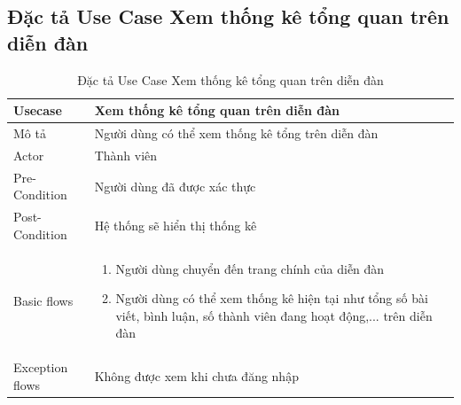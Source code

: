 \documentclass[../index.tex]{subfiles}
\begin{document}
    \subsection{Đặc tả Use Case Xem thống kê tổng quan trên diễn đàn}
    \begin{table}[H]
        \centering
        {}
        \begin{tabular}{ |p{3cm}|p{9cm}| }
            \hline
            Usecase         & Xem thống kê tổng quan trên diễn đàn                                                                                                                                                                                \\
            \hline
            Mô tả           & Người dùng có thể xem thống kê tổng trên diễn đàn                                                                                                                                                                   \\
            \hline
            Actor           & Thành viên                                                                                                                                                                                                          \\
            \hline
            Pre-Condition   & Người dùng đã được xác thực                                                                                                                                                                                         \\
            \hline
            Post-Condition  & Hệ thống sẽ hiển thị thống kê                                                                                                                                                                                       \\
            \hline
            Basic flows     & \begin{enumerate}\item Người dùng chuyển đến trang chính của diễn đàn

\item Người dùng có thể xem thống kê hiện tại như tổng số bài viết, bình luận, số thành viên đang hoạt động,... trên diễn đàn\end{enumerate} \\
            \hline
            Exception flows & Không được xem khi chưa đăng nhập                                                                                                                                                                                   \\
            \hline
        \end{tabular}
        \caption{Đặc tả Use Case Xem thống kê tổng quan trên diễn đàn}
    \end{table}
\end{document}

